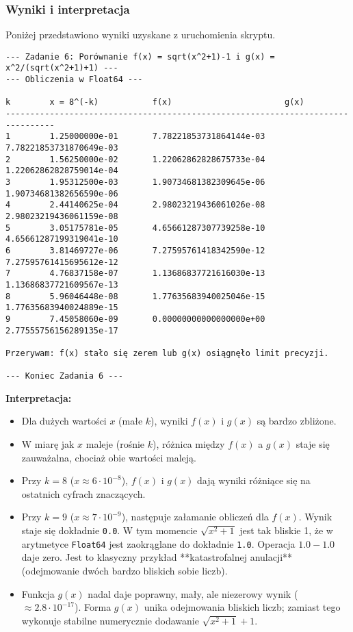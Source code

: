 \documentclass[11pt, a4paper]{article}
\begin{document}
\subsubsection{Wyniki i interpretacja}
Poniżej przedstawiono wyniki uzyskane z uruchomienia skryptu.
\begin{verbatim}
--- Zadanie 6: Porównanie f(x) = sqrt(x^2+1)-1 i g(x) = x^2/(sqrt(x^2+1)+1) ---
--- Obliczenia w Float64 ---

k        x = 8^(-k)           f(x)                       g(x)
--------------------------------------------------------------------------------
1        1.25000000e-01       7.78221853731864144e-03       7.78221853731870649e-03
2        1.56250000e-02       1.22062862828675733e-04       1.22062862828759014e-04
3        1.95312500e-03       1.90734681382309645e-06       1.90734681382656590e-06
4        2.44140625e-04       2.98023219436061026e-08       2.98023219436061159e-08
5        3.05175781e-05       4.65661287307739258e-10       4.65661287199319041e-10
6        3.81469727e-06       7.27595761418342590e-12       7.27595761415695612e-12
7        4.76837158e-07       1.13686837721616030e-13       1.13686837721609567e-13
8        5.96046448e-08       1.77635683940025046e-15       1.77635683940024889e-15
9        7.45058060e-09       0.00000000000000000e+00       2.77555756156289135e-17

Przerywam: f(x) stało się zerem lub g(x) osiągnęło limit precyzji.

--- Koniec Zadania 6 ---
\end{verbatim}

\noindent \textbf{Interpretacja:}
\begin{itemize}
    \item Dla dużych wartości $x$ (małe $k$), wyniki $f(x)$ i $g(x)$ są bardzo zbliżone.
    \item W miarę jak $x$ maleje (rośnie $k$), różnica między $f(x)$ a $g(x)$ staje się zauważalna, chociaż obie wartości maleją.
    \item Przy $k=8$ ($x \approx 6 \cdot 10^{-8}$), $f(x)$ i $g(x)$ dają wyniki różniące się na ostatnich cyfrach znaczących.
    \item Przy $k=9$ ($x \approx 7 \cdot 10^{-9}$), następuje załamanie obliczeń dla $f(x)$. Wynik staje się dokładnie \texttt{0.0}. W tym momencie $\sqrt{x^2+1}$ jest tak bliskie 1, że w arytmetyce \texttt{Float64} jest zaokrąglane do dokładnie \texttt{1.0}. Operacja $1.0 - 1.0$ daje zero. Jest to klasyczny przykład **katastrofalnej anulacji** (odejmowanie dwóch bardzo bliskich sobie liczb).
    
    \item Funkcja $g(x)$ nadal daje poprawny, mały, ale niezerowy wynik ($ \approx 2.8 \cdot 10^{-17}$). Forma $g(x)$ unika odejmowania bliskich liczb; zamiast tego wykonuje stabilne numerycznie dodawanie $\sqrt{x^2+1} + 1$.
\end{itemize}
\end{document}
